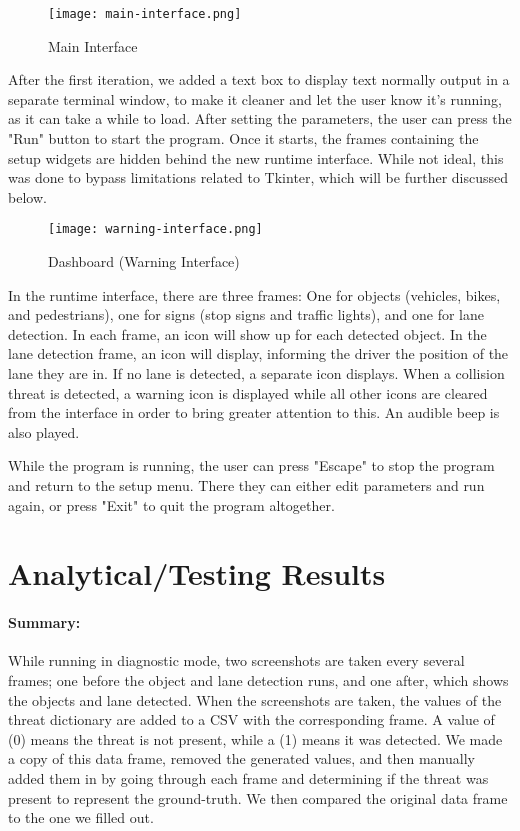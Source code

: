 \begin{figure}[h!]
	\centering
    \texttt{[image: main-interface.png]}
    \caption{Main Interface}
\end{figure}

After the first iteration, we added a text box to display text normally output in a separate terminal window, to make it cleaner and let the user know it's running, as it can take a while to load.  After setting the parameters, the user can press the "Run" button to start the program.  Once it starts, the frames containing the setup widgets are hidden behind the new runtime interface.  While not ideal, this was done to bypass limitations related to Tkinter, which will be further discussed below. \\

\begin{figure}[h!]
	\centering
    \texttt{[image: warning-interface.png]}
    \caption{Dashboard (Warning Interface)}
\end{figure}

In the runtime interface, there are three frames: One for objects (vehicles, bikes, and pedestrians), one for signs (stop signs and traffic lights), and one for lane detection.  In each frame, an icon will show up for each detected object.  In the lane detection frame, an icon will display, informing the driver the position of the lane they are in.  If no lane is detected, a separate icon displays.  When a collision threat is detected, a warning icon is displayed while all other icons are cleared from the interface in order to bring greater attention to this. An audible beep is also played.  

While the program is running, the user can press "Escape" to stop the program and return to the setup menu.  There they can either edit parameters and run again, or press "Exit" to quit the program altogether.  


\pagebreak


\section{Analytical/Testing Results}

\paragraph{Summary:}  While running in diagnostic mode, two screenshots are taken every several frames; one before the object and lane detection runs, and one after, which shows the objects and lane detected.  When the screenshots are taken, the values of the threat dictionary are added to a CSV with the corresponding frame. A value of (0) means the threat is not present, while a (1) means it was detected.  We made a copy of this data frame, removed the generated values, and then manually added them in by going through each frame and determining if the threat was present to represent the ground-truth.  We then compared the original data frame to the one we filled out.

